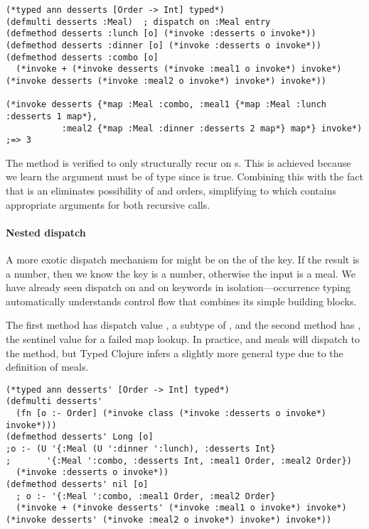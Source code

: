 \begin{exmp}
\begin{lstlisting}
(*typed ann desserts [Order -> Int] typed*)
(defmulti desserts :Meal)  ; dispatch on :Meal entry
(defmethod desserts :lunch [o] (*invoke :desserts o invoke*))
(defmethod desserts :dinner [o] (*invoke :desserts o invoke*))
(defmethod desserts :combo [o] 
  (*invoke + (*invoke desserts (*invoke :meal1 o invoke*) invoke*) (*invoke desserts (*invoke :meal2 o invoke*) invoke*) invoke*))

(*invoke desserts {*map :Meal :combo, :meal1 {*map :Meal :lunch :desserts 1 map*}, 
           :meal2 {*map :Meal :dinner :desserts 2 map*} map*} invoke*) ;=> 3
\end{lstlisting}
\label{example:desserts-on-meal}
\end{exmp}
%
The  method is verified to only structurally recur
on s. This is achieved because we learn the argument  must
be of type
since
is true. Combining this
with the fact that  is an 
eliminates possibility of  and 
orders, simplifying  to
which contains appropriate arguments for both recursive calls.

\paragraph{Nested dispatch}
A more exotic dispatch mechanism for 
might be on the  of the  key.
If the result is a number, then we know the 
key is a number, otherwise the input is a  meal.
We have already seen dispatch on  and on keywords
in isolation---occurrence typing automatically understands
control flow that combines its simple building blocks.

The first method has dispatch value , a subtype
of , and the second method has , the sentinel value for a failed map lookup.
In practice,  and  meals will dispatch to the 
method, but Typed Clojure infers a slightly more general type due to the definition
of  meals.

\begin{exmp}
\begin{lstlisting}
(*typed ann desserts' [Order -> Int] typed*)
(defmulti desserts' 
  (fn [o :- Order] (*invoke class (*invoke :desserts o invoke*) invoke*)))
(defmethod desserts' Long [o] 
;o :- (U '{:Meal (U ':dinner ':lunch), :desserts Int}
;       '{:Meal ':combo, :desserts Int, :meal1 Order, :meal2 Order})
  (*invoke :desserts o invoke*))
(defmethod desserts' nil [o]
  ; o :- '{:Meal ':combo, :meal1 Order, :meal2 Order}
  (*invoke + (*invoke desserts' (*invoke :meal1 o invoke*) invoke*) (*invoke desserts' (*invoke :meal2 o invoke*) invoke*) invoke*))
\end{lstlisting}
\label{example:desserts-on-class}
\end{exmp}
%

